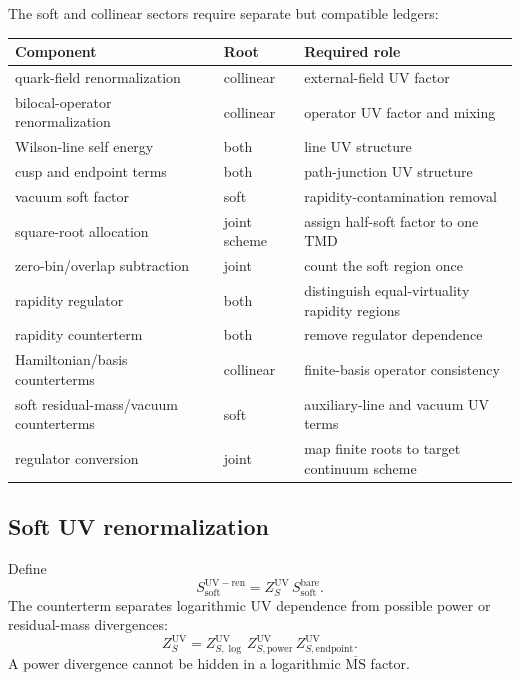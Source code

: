 \documentclass[11pt]{article}
\newcommand{\Soft}{\ensuremath{\mathrm{soft}}}
\newcommand{\Bare}{\ensuremath{\mathrm{bare}}}
\begin{document}
The soft and collinear sectors require separate but compatible ledgers:
\begin{longtable}{L{0.32\textwidth}L{0.25\textwidth}L{0.34\textwidth}}
\toprule
Component & Root & Required role\\
\midrule
\endhead
quark-field renormalization & collinear & external-field UV factor\\
bilocal-operator renormalization & collinear & operator UV factor and mixing\\
Wilson-line self energy & both & line UV structure\\
cusp and endpoint terms & both & path-junction UV structure\\
vacuum soft factor & soft & rapidity-contamination removal\\
square-root allocation & joint scheme & assign half-soft factor to one TMD\\
zero-bin/overlap subtraction & joint & count the soft region once\\
rapidity regulator & both & distinguish equal-virtuality rapidity regions\\
rapidity counterterm & both & remove regulator dependence\\
Hamiltonian/basis counterterms & collinear & finite-basis operator consistency\\
soft residual-mass/vacuum counterterms & soft & auxiliary-line and vacuum UV terms\\
regulator conversion & joint & map finite roots to target continuum scheme\\
\bottomrule
\end{longtable}

\subsection{Soft UV renormalization}

Define
\begin{equation}
 S_{\Soft}^{\mathrm{UV-ren}}
 =
 Z_{S}^{\mathrm{UV}}\,
 S_{\Soft}^{\Bare}.
 \label{eq:soft-uv}
\end{equation}
The counterterm separates logarithmic UV dependence from possible power or residual-mass divergences:
\begin{equation}
 Z_S^{\mathrm{UV}}
 =
 Z_{S,\log}^{\mathrm{UV}}\,
 Z_{S,\mathrm{power}}^{\mathrm{UV}}\,
 Z_{S,\mathrm{endpoint}}^{\mathrm{UV}}.
 \label{eq:soft-uv-separation}
\end{equation}
A power divergence cannot be hidden in a logarithmic \(\overline{\mathrm{MS}}\) factor.
\end{document}
